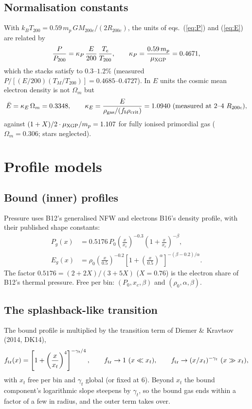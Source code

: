 \documentclass[10pt,a4paper]{article}
\newcommand{\Rc}{R_{200c}}
\newcommand{\ftr}{f_{\rm tr}}
\begin{document}
\subsection{Normalisation constants}
With $k_BT_{200}=0.59\,m_p\,GM_{200c}/(2\Rc)$, the units of eqs.~(\ref{eq:P}) and (\ref{eq:E}) are related by
\begin{equation}
\frac{P}{P_{200}}=\kappa_P\,\frac{E}{200}\,\frac{T_e}{T_{200}},\qquad \kappa_P=\frac{0.59\,m_p}{\mu_{\rm XGP}}=0.4671,
\label{eq:kappaP}
\end{equation}
which the stacks satisfy to $0.3$--$1.2\%$ (measured $P/[(E/200)(T_M/T_{200})]=0.4685$--$0.4727$). In $E$ units the cosmic
mean electron density is not $\Omega_m$ but
\begin{equation}
\bar E=\kappa_E\,\Omega_m=0.3348,\qquad \kappa_E=\frac{E}{\rho_{\rm gas}/(f_b\rho_{\rm crit})}=1.0940\ \text{(measured at 2--4 }\Rc),
\label{eq:ebar}
\end{equation}
against $(1+X)/2\cdot\mu_{\rm XGP}/m_p=1.107$ for fully ionised primordial gas ($\Omega_m=0.306$; stars neglected).

\section{Profile models}\label{sec:models}

\subsection{Bound (inner) profiles}
Pressure uses B12's generalised NFW and electrons B16's density profile, with their published shape constants:
\begin{align}
P_g(x)&=0.5176\,P_0\left(\frac{x}{x_c}\right)^{-0.3}\left(1+\frac{x}{x_c}\right)^{-\beta}, \label{eq:B12}\\
E_g(x)&=\rho_0\left(\frac{x}{0.5}\right)^{-0.2}\left[1+\left(\frac{x}{0.5}\right)^{\alpha}\right]^{-(\beta-0.2)/\alpha}. \label{eq:B16}
\end{align}
The factor $0.5176=(2+2X)/(3+5X)$ ($X=0.76$) is the electron share of B12's thermal pressure. Free per bin: $(P_0,x_c,\beta)$ and
$(\rho_0,\alpha,\beta)$.

\subsection{The splashback-like transition}\label{sec:transition}
The bound profile is multiplied by the transition term of Diemer \& Kravtsov (2014, DK14),
\begin{equation}
\ftr(x)=\left[1+\left(\frac{x}{x_t}\right)^4\right]^{-\gamma_t/4},
\qquad
\ftr\to1\ (x\ll x_t),\qquad \ftr\to(x/x_t)^{-\gamma_t}\ (x\gg x_t), \label{eq:ftr}
\end{equation}
with $x_t$ free per bin and $\gamma_t$ global (or fixed at 6). Beyond $x_t$ the bound component's logarithmic slope steepens
by $\gamma_t$, so the bound gas ends within a factor of a few in radius, and the outer term takes over.
\end{document}
